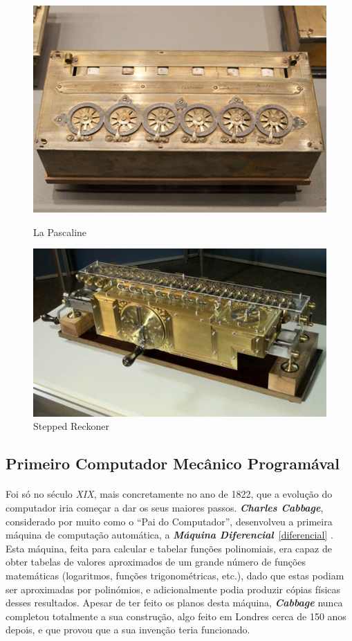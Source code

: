 \documentclass{report}
\begin{document}
\begin{figure}[!htb]
   \begin{minipage}{0.5\textwidth}
     \centering
     \includegraphics[width=.6\linewidth]{Pascaline.jpg}
     \caption{La Pascaline}
     \label{pascaline}
   \end{minipage}\hfill
   \begin{minipage}{0.5\textwidth}
     \centering
     \includegraphics[width=.73\linewidth]{SteppedReckoner.jpeg}
     \caption{Stepped Reckoner}
     \label{reckoner}
   \end{minipage}
\end{figure}


\subsection{Primeiro Computador Mecânico Programával} 
\paragraph{}
Foi só no século \textit{XIX}, mais concretamente no ano de 1822, que a evolução do computador iria começar a dar os seus maiores passos. \textbf{\textit{Charles Cabbage}}, considerado por muito como o “Pai do Computador”, desenvolveu a primeira máquina de computação automática, a \textbf{\textit{Máquina Diferencial}}~\ref{diferencial} \cite{Cabbage}. \newline
Esta máquina, feita para calcular e tabelar funções polinomiais, era capaz de obter tabelas de valores aproximados de um grande número de funções matemáticas (logaritmos, funções trigonométricas, etc.), dado que estas podiam ser aproximadas por polinómios, e adicionalmente podia produzir cópias físicas desses resultados. \newline
Apesar de ter feito os planos desta máquina, \textbf{\textit{Cabbage}} nunca completou totalmente a sua construção, algo feito em Londres cerca de 150 anos depois, e que provou que a sua invenção teria funcionado.
\end{document}
